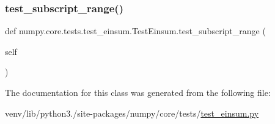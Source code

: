\subsubsection{\texorpdfstring{test\+\_\+subscript\+\_\+range()}{test\_subscript\_range()}}
{\footnotesize\ttfamily def numpy.\+core.\+tests.\+test\+\_\+einsum.\+Test\+Einsum.\+test\+\_\+subscript\+\_\+range (\begin{DoxyParamCaption}\item[{}]{self }\end{DoxyParamCaption})}



The documentation for this class was generated from the following file\+:\begin{DoxyCompactItemize}
\item 
venv/lib/python3./site-\/packages/numpy/core/tests/\hyperlink{test__einsum_8py}{test\+\_\+einsum.\+py}\end{DoxyCompactItemize}
